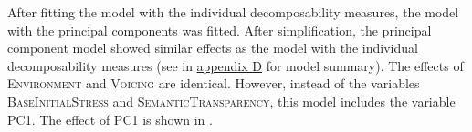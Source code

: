     \begin{table}
    	\caption{ Summary of linear model for variables predicting the relative  duration of [s] in prefixed words with voiceless /s/}
    	\label{tbl: summary model7}
    	
    	
    \end{table}



After fitting the model with the individual decomposability measures, the model with the principal components was fitted. After simplification, the principal component model showed similar effects as the model with the individual decomposability measures (see  in \hyperref[Appendix D: model summaries corpus]{appendix D} for model summary). The effects of \textsc{Environment} and \textsc{Voicing} are identical. However, instead of the variables \textsc{BaseInitialStress} and \textsc{SemanticTransparency}, this model includes the variable \textsc{PC1}. 
The effect of \textsc{PC1} is shown in . 


